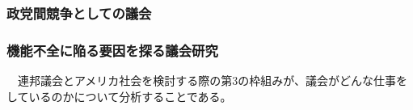 \subsubsection{政党間競争としての議会}

\subsubsection{機能不全に陥る要因を探る議会研究}
　連邦議会とアメリカ社会を検討する際の第3の枠組みが、議会がどんな仕事をしているのかについて分析することである。